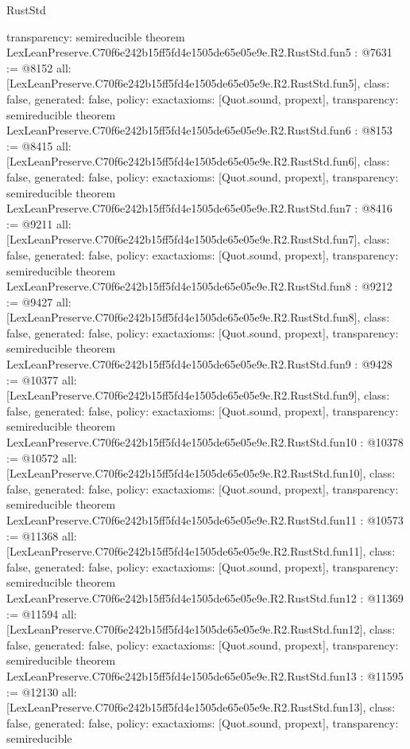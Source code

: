 \begin{lexlean}{RustStd}
\begin{coremodule}
{  transparency: semireducible
}
theorem LexLeanPreserve.C70f6e242b15ff5fd4e1505de65e05e9e.R2.RustStd.fun5 : @7631 := @8152 {
  all: [LexLeanPreserve.C70f6e242b15ff5fd4e1505de65e05e9e.R2.RustStd.fun5],
  class: false,
  generated: false,
  policy: exact{axioms: [Quot.sound, propext]},
  transparency: semireducible
}
theorem LexLeanPreserve.C70f6e242b15ff5fd4e1505de65e05e9e.R2.RustStd.fun6 : @8153 := @8415 {
  all: [LexLeanPreserve.C70f6e242b15ff5fd4e1505de65e05e9e.R2.RustStd.fun6],
  class: false,
  generated: false,
  policy: exact{axioms: [Quot.sound, propext]},
  transparency: semireducible
}
theorem LexLeanPreserve.C70f6e242b15ff5fd4e1505de65e05e9e.R2.RustStd.fun7 : @8416 := @9211 {
  all: [LexLeanPreserve.C70f6e242b15ff5fd4e1505de65e05e9e.R2.RustStd.fun7],
  class: false,
  generated: false,
  policy: exact{axioms: [Quot.sound, propext]},
  transparency: semireducible
}
theorem LexLeanPreserve.C70f6e242b15ff5fd4e1505de65e05e9e.R2.RustStd.fun8 : @9212 := @9427 {
  all: [LexLeanPreserve.C70f6e242b15ff5fd4e1505de65e05e9e.R2.RustStd.fun8],
  class: false,
  generated: false,
  policy: exact{axioms: [Quot.sound, propext]},
  transparency: semireducible
}
theorem LexLeanPreserve.C70f6e242b15ff5fd4e1505de65e05e9e.R2.RustStd.fun9 : @9428 := @10377 {
  all: [LexLeanPreserve.C70f6e242b15ff5fd4e1505de65e05e9e.R2.RustStd.fun9],
  class: false,
  generated: false,
  policy: exact{axioms: [Quot.sound, propext]},
  transparency: semireducible
}
theorem LexLeanPreserve.C70f6e242b15ff5fd4e1505de65e05e9e.R2.RustStd.fun10 : @10378 := @10572 {
  all: [LexLeanPreserve.C70f6e242b15ff5fd4e1505de65e05e9e.R2.RustStd.fun10],
  class: false,
  generated: false,
  policy: exact{axioms: [Quot.sound, propext]},
  transparency: semireducible
}
theorem LexLeanPreserve.C70f6e242b15ff5fd4e1505de65e05e9e.R2.RustStd.fun11 : @10573 := @11368 {
  all: [LexLeanPreserve.C70f6e242b15ff5fd4e1505de65e05e9e.R2.RustStd.fun11],
  class: false,
  generated: false,
  policy: exact{axioms: [Quot.sound, propext]},
  transparency: semireducible
}
theorem LexLeanPreserve.C70f6e242b15ff5fd4e1505de65e05e9e.R2.RustStd.fun12 : @11369 := @11594 {
  all: [LexLeanPreserve.C70f6e242b15ff5fd4e1505de65e05e9e.R2.RustStd.fun12],
  class: false,
  generated: false,
  policy: exact{axioms: [Quot.sound, propext]},
  transparency: semireducible
}
theorem LexLeanPreserve.C70f6e242b15ff5fd4e1505de65e05e9e.R2.RustStd.fun13 : @11595 := @12130 {
  all: [LexLeanPreserve.C70f6e242b15ff5fd4e1505de65e05e9e.R2.RustStd.fun13],
  class: false,
  generated: false,
  policy: exact{axioms: [Quot.sound, propext]},
  transparency: semireducible
}
\end{coremodule}
\end{lexlean}
